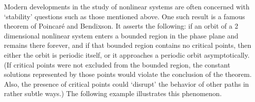 Modern developments in the study of nonlinear systems are often
concerned with  `stability' questions such  as
those mentioned above.   One such result is a famous theorem of
Poincar\'e and Bendixson.   It asserts the following:  if
%
an orbit of a 2 dimensional nonlinear system enters a bounded region in
the phase
plane
and remains there forever, and if that bounded region contains no
critical points, then either the orbit
is periodic itself, or it approaches a periodic orbit asymptotically.
(If critical points were not excluded from the bounded region,
the constant solutions represented by those points
would violate the conclusion of the theorem.
Also, the presence of critical points could `disrupt' the behavior
 of other paths
in rather subtle ways.)
The following example illustrates  this phenomenon.

